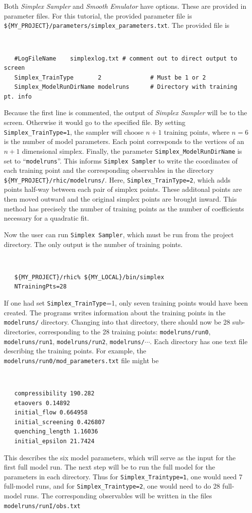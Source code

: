 \documentclass[UserManual.tex]{subfiles}
\begin{document}
Both {\it Simplex Sampler} and {\it Smooth Emulator} have options. These are provided in parameter files. For this tutorial, the provided parameter file is {\tt \$\{MY\_PROJECT\}/parameters/simplex\_parameters.txt}. The provided file is
{\tt
\begin{verbatim}
   #LogFileName    simplexlog.txt # comment out to direct output to screen
   Simplex_TrainType       2              # Must be 1 or 2             
   Simplex_ModelRunDirName modelruns      # Directory with training pt. info
\end{verbatim}
}
Because the first line is commented, the output of {\it Simplex Sampler} will be to the screen. Otherwise it would go to the specified file. By setting {\tt Simplex\_TrainType=1}, the sampler will choose $n+1$ training points, where $n=6$ is the number of model parameters. Each point corresponds to the vertices of an $n+1$ dimensional simplex.  Finally, the parameter {\tt Simplex\_ModelRunDirName} is set to ``{\tt modelruns}''. This informs {\tt Simplex Sampler} to write the coordinates of each training point and the corresponding observables in the directory {\tt \$\{MY\_PROJECT\}/rhic/modelruns/}. Here, {\tt Simplex\_TrainType=2}, which adds points half-way between each pair of simplex points. These additonal points are then moved outward and the original simplex points are brought inward. This method has precisely the number of training points as the number of coefficients necessary for a quadratic fit. 

Now the user can run {\tt Simplex Sampler}, which must be run from the project directory. The only output is the number of training points.
 {\tt
\begin{verbatim}
   ${MY_PROJECT}/rhic% ${MY_LOCAL}/bin/simplex
   NTrainingPts=28
\end{verbatim}
}
If one had set {\tt Simplex\_TrainType}=1, only seven training points would have been created. The programs writes information about the training points in the {\tt modelruns/} directory. Changing into that directory, there should now be 28 sub-directories, corresponding to the 28 training points: {\tt modelruns/run0}, {\tt modelruns/run1}, {\tt modelruns/run2}, {\tt modelruns/}$\cdots$. Each directory has one text file describing the training points. For example, the {\tt modelruns/run0/mod\_parameters.txt} file might be 
{\tt
\begin{verbatim}
   compressibility 190.282
   etaovers 0.14892
   initial_flow 0.664958
   initial_screening 0.426807
   quenching_length 1.16036
   initial_epsilon 21.7424
\end{verbatim}
}
This describes the six model parameters, which will serve as the input for the first full model run.  The next step will be to run the full model for the parameters in each directory. Thus for {\tt Simplex\_Traintype=1}, one would need 7 full-model runs, and for {\tt Simplex\_Traintype=2}, one would need to do 28 full-model runs. The corresponding observables will be written in the files {\tt modelruns/runI/obs.txt}
\end{document}
